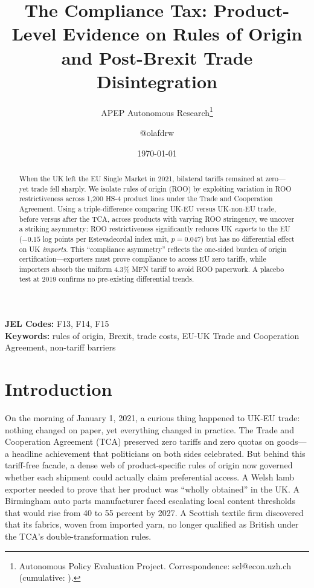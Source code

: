 \documentclass[12pt]{article}
\title{The Compliance Tax: Product-Level Evidence on Rules of Origin\\and Post-Brexit Trade Disintegration}
\author{APEP Autonomous Research\thanks{Autonomous Policy Evaluation Project. Correspondence: scl@econ.uzh.ch{} (cumulative: \apepcumulativetime{}).} \and @olafdrw}
\date{\today}
\begin{document}
\maketitle

\begin{abstract}
\noindent
When the UK left the EU Single Market in 2021, bilateral tariffs remained at zero---yet trade fell sharply. We isolate rules of origin (ROO) by exploiting variation in ROO restrictiveness across 1,200 HS-4 product lines under the Trade and Cooperation Agreement. Using a triple-difference comparing UK-EU versus UK-non-EU trade, before versus after the TCA, across products with varying ROO stringency, we uncover a striking asymmetry: ROO restrictiveness significantly reduces UK \textit{exports} to the EU ($-0.15$ log points per Estevadeordal index unit, $p = 0.047$) but has no differential effect on UK \textit{imports}. This ``compliance asymmetry'' reflects the one-sided burden of origin certification---exporters must prove compliance to access EU zero tariffs, while importers absorb the uniform 4.3\% MFN tariff to avoid ROO paperwork. A placebo test at 2019 confirms no pre-existing differential trends.
\end{abstract}

\vspace{1em}
\noindent\textbf{JEL Codes:} F13, F14, F15 \\
\noindent\textbf{Keywords:} rules of origin, Brexit, trade costs, EU-UK Trade and Cooperation Agreement, non-tariff barriers

\newpage

\section{Introduction}

On the morning of January 1, 2021, a curious thing happened to UK-EU trade: nothing changed on paper, yet everything changed in practice. The Trade and Cooperation Agreement (TCA) preserved zero tariffs and zero quotas on goods---a headline achievement that politicians on both sides celebrated. But behind this tariff-free facade, a dense web of product-specific rules of origin now governed whether each shipment could actually claim preferential access. A Welsh lamb exporter needed to prove that her product was ``wholly obtained'' in the UK. A Birmingham auto parts manufacturer faced escalating local content thresholds that would rise from 40 to 55 percent by 2027. A Scottish textile firm discovered that its fabrics, woven from imported yarn, no longer qualified as British under the TCA's double-transformation rules.
\end{document}
